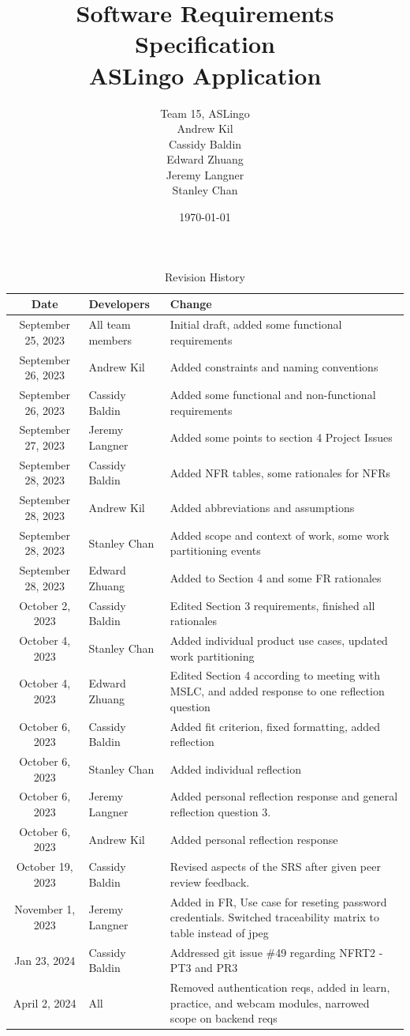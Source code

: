 \documentclass[12pt, titlepage]{article}
\title{Software Requirements Specification\\ASLingo Application}
\author{Team 15, ASLingo
		\\ Andrew Kil
		\\ Cassidy Baldin
		\\ Edward Zhuang
		\\ Jeremy Langner
		\\ Stanley Chan
}
\date{\today}
\begin{document}
\maketitle

\tableofcontents
\listoftables
\listoffigures

\newpage

\begin{longtable}{| c | p{3cm} | p{6.5cm} |}
\caption{Revision History} \\
\hline {\bf Date} & {\bf Developers} & {\bf Change}\\
\hline
September 25, 2023 & All team members & Initial draft, added some functional requirements \\
September 26, 2023 & Andrew Kil & Added constraints and naming conventions \\
September 26, 2023 & Cassidy Baldin & Added some functional and non-functional requirements \\
September 27, 2023 & Jeremy Langner & Added some points to section 4 Project Issues \\
September 28, 2023 & Cassidy Baldin & Added NFR tables, some rationales for NFRs \\
September 28, 2023 & Andrew Kil & Added abbreviations and assumptions \\
September 28, 2023 & Stanley Chan & Added scope and context of work, some work partitioning events \\
September 28, 2023 & Edward Zhuang & Added to Section 4 and some FR rationales \\
October 2, 2023 & Cassidy Baldin & Edited Section 3 requirements, finished all rationales \\
October 4, 2023 & Stanley Chan & Added individual product use cases, updated work partitioning \\
October 4, 2023 & Edward Zhuang & Edited Section 4 according to meeting with MSLC, and added response to one reflection question \\
October 6, 2023 & Cassidy Baldin & Added fit criterion, fixed formatting, added reflection \\
October 6, 2023 & Stanley Chan & Added individual reflection \\
October 6, 2023 & Jeremy Langner & Added personal reflection response and general reflection question 3. \\
October 6, 2023 & Andrew Kil & Added personal reflection response\\
October 19, 2023 & Cassidy Baldin & Revised aspects of the SRS after given peer review feedback. \\
November 1, 2023 & Jeremy Langner & Added in FR, Use case for reseting password credentials. Switched traceability matrix to table instead of jpeg\\
Jan 23, 2024 & Cassidy Baldin & Addressed git issue \#49 regarding NFRT2 - PT3 and PR3 \\
April 2, 2024 & All & Removed authentication reqs, added in learn, practice, and webcam modules, narrowed scope on backend reqs\\
\bottomrule
\end{longtable}
\end{document}
